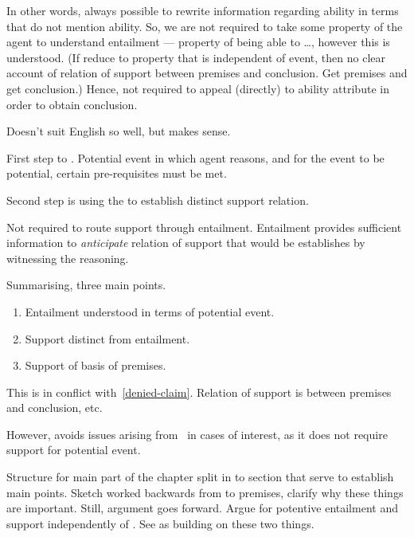 \begin{note}
  In other words, always possible to rewrite information regarding ability in terms that do not mention ability.
  So, we are not required to take some property of the agent to understand entailment --- property of being able to \dots, however this is understood.
  (If reduce to property that is independent of event, then no clear account of relation of support between premises and conclusion.
  Get premises and get conclusion.)
  Hence, not required to appeal (directly) to ability attribute in order to obtain conclusion.

  Doesn't suit English so well, but makes sense.

  First step to \WR{}.
  Potential event in which agent reasons, and for the event to be potential, certain pre-requisites must be met.

  Second step is using the \gen{} to establish distinct support relation.

  Not required to route support through entailment.
  Entailment provides sufficient information to \emph{anticipate} relation of support that would be establishes by witnessing the reasoning.

  Summarising, three main points.
  \begin{enumerate}
  \item Entailment understood in terms of potential event.
  \item Support distinct from entailment.
  \item Support of basis of premises.
  \end{enumerate}

  This is in conflict with~\ref{denied-claim}.
  Relation of support is between premises and conclusion, etc.

  However, avoids issues arising from~\nI{} in cases of interest, as it does not require support for potential event.

  Structure for main part of the chapter split in to section that serve to establish main points.
  Sketch worked backwards from \WR{} to premises, clarify why these things are important.
  Still, argument goes forward.
  Argue for potentive entailment and support independently of \WR{}.
  See \WR{} as building on these two things.
\end{note}

